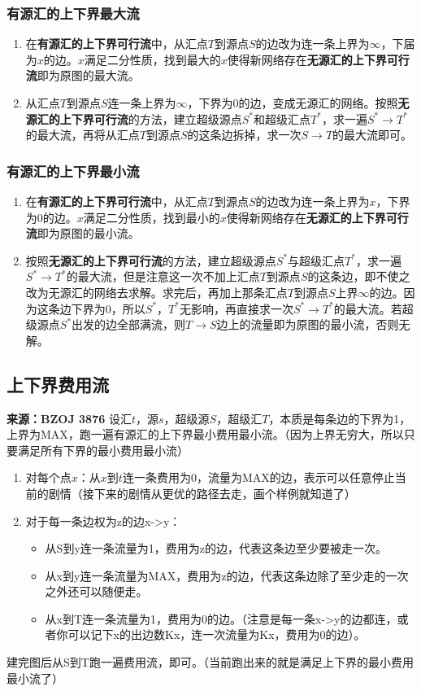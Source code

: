 \documentclass[a4paper,openany]{book}
\begin{document}
\begin{spacing}{0.9}
			\subsubsection*{有源汇的上下界最大流}
			\begin{enumerate}
				\item 在\textbf{有源汇的上下界可行流}中，从汇点$T$到源点$S$的边改为连一条上界为$\infty$，下届为$x$的边。$x$满足二分性质，找到最大的$x$使得新网络存在\textbf{无源汇的上下界可行流}即为原图的最大流。
				\item 从汇点$T$到源点$S$连一条上界为$\infty$，下界为$0$的边，变成无源汇的网络。按照\textbf{无源汇的上下界可行流}的方法，建立超级源点$S^*$和超级汇点$T^*$，求一遍$S^* \rightarrow T^*$的最大流，再将从汇点$T$到源点$S$的这条边拆掉，求一次$S \rightarrow T$的最大流即可。
			\end{enumerate}
			\subsubsection*{有源汇的上下界最小流}
			\begin{enumerate}
				\item 在\textbf{有源汇的上下界可行流}中，从汇点$T$到源点$S$的边改为连一条上界为$x$，下界为$0$的边。$x$满足二分性质，找到最小的$x$使得新网络存在\textbf{无源汇的上下界可行流}即为原图的最小流。
				\item 按照\textbf{无源汇的上下界可行流}的方法，建立超级源点$S^*$与超级汇点$T^*$，求一遍$S^* \rightarrow T^*$的最大流，但是注意这一次不加上汇点$T$到源点$S$的这条边，即不使之改为无源汇的网络去求解。求完后，再加上那条汇点$T$到源点$S$上界$\infty$的边。因为这条边下界为$0$，所以$S^*$，$T^*$无影响，再直接求一次$S^* \rightarrow T^*$的最大流。若超级源点$S^*$出发的边全部满流，则$T \rightarrow S$边上的流量即为原图的最小流，否则无解。
			\end{enumerate}
			\subsection*{上下界费用流}
			\noindent \textbf{来源：BZOJ 3876}
			\noindent 设汇$t$，源$s$，超级源$S$，超级汇$T$，本质是每条边的下界为1，上界为MAX，跑一遍有源汇的上下界最小费用最小流。（因为上界无穷大，所以只要满足所有下界的最小费用最小流）
			\begin{enumerate}
				\item 对每个点$x$：从$x$到$t$连一条费用为0，流量为MAX的边，表示可以任意停止当前的剧情（接下来的剧情从更优的路径去走，画个样例就知道了）
				\item 对于每一条边权为z的边x->y：
				\begin{itemize}
					\item 从S到y连一条流量为1，费用为z的边，代表这条边至少要被走一次。
					\item 从x到y连一条流量为MAX，费用为z的边，代表这条边除了至少走的一次之外还可以随便走。
					\item 从x到T连一条流量为1，费用为0的边。（注意是每一条x->y的边都连，或者你可以记下x的出边数Kx，连一次流量为Kx，费用为0的边）。
				\end{itemize}
			\end{enumerate}
			建完图后从S到T跑一遍费用流，即可。（当前跑出来的就是满足上下界的最小费用最小流了）

\end{spacing}
\end{document}
